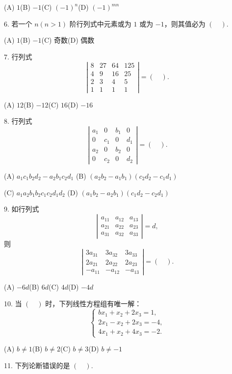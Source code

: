 \documentclass[UTF8,12pt,a4paper,fontset=fandol]{ctexart}
\begin{document}
(A) $1$\qquad (B) $-1$\qquad (C) $(-1)^n$\qquad (D) $(-1)^{mn}$

6. 若一个 $n(n>1)$ 阶行列式中元素或为 $1$ 或为 $-1$，则其值必为 $(\quad)$.

(A) $1$\qquad (B) $-1$\qquad (C) 奇数\qquad (D) 偶数

7. 行列式
\[
\left|\begin{array}{cccc}
8&27&64&125\\
4&9&16&25\\
2&3&4&5\\
1&1&1&1
\end{array}\right|=(\quad).
\]

(A) $12$\qquad (B) $-12$\qquad (C) $16$\qquad (D) $-16$

8. 行列式
\[
\left|\begin{array}{cccc}
a_1&0&b_1&0\\
0&c_1&0&d_1\\
a_2&0&b_2&0\\
0&c_2&0&d_2
\end{array}\right|=(\quad).
\]

(A) $a_1c_1b_2d_2-a_2b_1c_2d_1$\qquad
(B) $(a_2b_2-a_1b_1)(c_2d_2-c_1d_1)$

(C) $a_1a_2b_1b_2c_1c_2d_1d_2$\qquad
(D) $(a_1b_2-a_2b_1)(c_1d_2-c_2d_1)$

9. 如行列式
\[
\left|\begin{array}{ccc}
a_{11}&a_{12}&a_{13}\\
a_{21}&a_{22}&a_{23}\\
a_{31}&a_{32}&a_{33}
\end{array}\right|=d,
\]
则
\[
\left|\begin{array}{ccc}
3a_{31}&3a_{32}&3a_{33}\\
2a_{21}&2a_{22}&2a_{23}\\
-a_{11}&-a_{12}&-a_{13}
\end{array}\right|=(\quad).
\]

(A) $-6d$\qquad (B) $6d$\qquad (C) $4d$\qquad (D) $-4d$

10. 当 $(\quad)$ 时，下列线性方程组有唯一解：
\[
\left\{\begin{array}{l}
bx_1+x_2+2x_3=1,\\
2x_1-x_2+2x_3=-4,\\
4x_1+x_2+4x_3=-2.
\end{array}\right.
\]

(A) $b\ne1$\qquad (B) $b\ne2$\qquad (C) $b\ne3$\qquad (D) $b\ne-1$

11. 下列论断错误的是 $(\quad)$.
\end{document}
